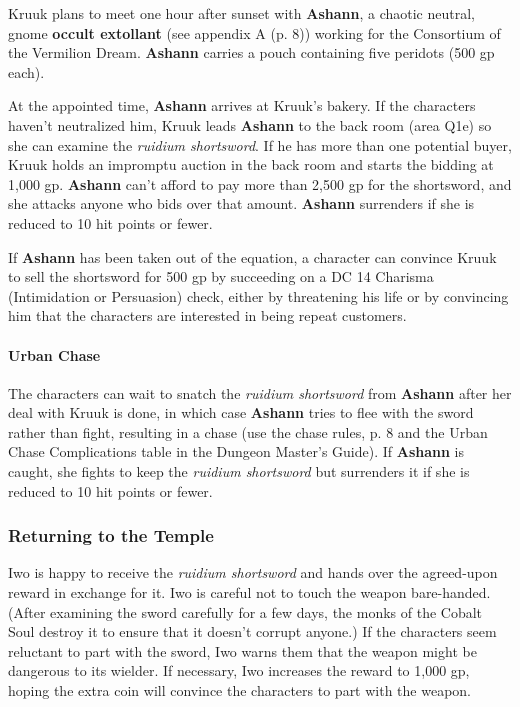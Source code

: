 \documentclass[letterpaper, 11pt, bg=full, twocolumn]{dndbook}
\begin{document}
Kruuk plans to meet one hour after sunset with \textbf{Ashann}, a chaotic neutral, gnome \textbf{occult extollant} (see appendix A (p. 8)) working for the Consortium of the Vermilion Dream. \textbf{Ashann} carries a pouch containing five peridots (500 gp each).


At the appointed time, \textbf{Ashann} arrives at Kruuk's bakery. If the characters haven't neutralized him, Kruuk leads \textbf{Ashann} to the back room (area Q1e) so she can examine the \textit{ruidium shortsword}. If he has more than one potential buyer, Kruuk holds an impromptu auction in the back room and starts the bidding at 1,000 gp. \textbf{Ashann} can't afford to pay more than 2,500 gp for the shortsword, and she attacks anyone who bids over that amount. \textbf{Ashann} surrenders if she is reduced to 10 hit points or fewer.

If \textbf{Ashann} has been taken out of the equation, a character can convince Kruuk to sell the shortsword for 500 gp by succeeding on a DC 14 Charisma (Intimidation or Persuasion) check, either by threatening his life or by convincing him that the characters are interested in being repeat customers.

\paragraph{Urban Chase}

The characters can wait to snatch the \textit{ruidium shortsword} from \textbf{Ashann} after her deal with Kruuk is done, in which case \textbf{Ashann} tries to flee with the sword rather than fight, resulting in a chase (use the chase rules, p. 8 and the Urban Chase Complications table in the Dungeon Master's Guide). If \textbf{Ashann} is caught, she fights to keep the \textit{ruidium shortsword} but surrenders it if she is reduced to 10 hit points or fewer.

\subsubsection{Returning to the Temple}

Iwo is happy to receive the \textit{ruidium shortsword} and hands over the agreed-upon reward in exchange for it. Iwo is careful not to touch the weapon bare-handed. (After examining the sword carefully for a few days, the monks of the Cobalt Soul destroy it to ensure that it doesn't corrupt anyone.) If the characters seem reluctant to part with the sword, Iwo warns them that the weapon might be dangerous to its wielder. If necessary, Iwo increases the reward to 1,000 gp, hoping the extra coin will convince the characters to part with the weapon.
\end{document}
